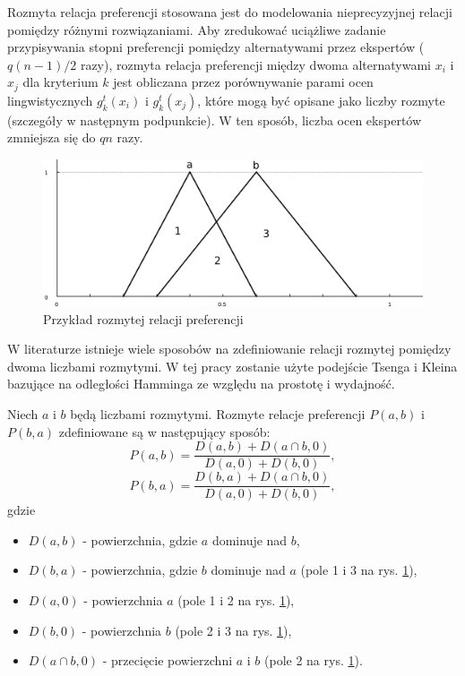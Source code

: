 Rozmyta relacja preferencji stosowana jest do modelowania
nieprecyzyjnej relacji pomiędzy różnymi rozwiązaniami. Aby zredukować uciążliwe
zadanie przypisywania stopni preferencji pomiędzy alternatywami przez ekspertów
($q(n-1)/2$ razy), rozmyta relacja preferencji między dwoma alternatywami $x_i$
i $x_j$ dla kryterium $k$ jest obliczana przez porównywanie parami ocen
lingwistycznych $g^t_k(x_i)$ i $g^t_k(x_j)$, które mogą być opisane jako liczby
rozmyte (szczegóły w następnym podpunkcie). W ten sposób, liczba ocen ekspertów
zmniejsza się do $qn$ razy.
\begin{figure}[ht]
  \includegraphics[width=\linewidth]
    {chapters/preferences/rozmyta_relacja_a}
  \caption{Przykład rozmytej relacji preferencji}
  \label{fig:rozmyta_relacja_preferencji}
\end{figure}
W literaturze istnieje wiele sposobów na zdefiniowanie relacji rozmytej pomiędzy
dwoma liczbami rozmytymi. W tej pracy zostanie użyte podejście Tsenga i Kleina
 bazujące na odległości Hamminga ze względu na prostotę i
wydajność.

\begin{definition}
\label{def:rozmyta_relacja_preferencji}
Niech $a$ i $b$ będą liczbami rozmytymi. Rozmyte relacje preferencji $P(a,b)$ i
$P(b,a)$ zdefiniowane są w następujący sposób:
\begin{equation}
P(a,b) = \frac{D(a,b) + D(a \cap b, 0)}{D(a,0) + D(b,0)},
\end{equation}
\begin{equation}
P(b,a) = \frac{D(b,a) + D(a \cap b, 0)}{D(a,0) + D(b,0)},
\end{equation}
gdzie
\begin{itemize}
  \item[] $D(a,b)$ - powierzchnia, gdzie $a$ dominuje nad $b$,
  \item[] $D(b,a)$ - powierzchnia, gdzie $b$ dominuje nad $a$ (pole 1 i 3 na
  	rys. \ref{fig:rozmyta_relacja_preferencji}),
  \item[] $D(a,0)$ - powierzchnia $a$ (pole 1 i 2 na rys.
     \ref{fig:rozmyta_relacja_preferencji}),
  \item[] $D(b,0)$ - powierzchnia $b$ (pole 2 i 3 na rys.
  	\ref{fig:rozmyta_relacja_preferencji}),
  \item[] $D(a \cap b, 0)$ - przecięcie powierzchni $a$ i $b$ (pole 2 na rys.
  	\ref{fig:rozmyta_relacja_preferencji}).
\end{itemize}
\end{definition}

